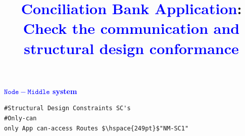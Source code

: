 \documentclass[12pt]{article}
\title{\textcolor{blue}{Conciliation Bank Application}:\\{\large \textcolor{blue}{Check the communication and structural design conformance}}}
\newcommand*{\mcode}[1]{%
$\mathtt{#1}$%
}
\begin{document}
 
\sloppy
\maketitle

\vspace{-0.3cm}
\label{sec:Estruturaltodos}



\noindent\textbf{\textcolor{blue}{\mcode{{Node}{-}{Middle}} system}}
\label{sec:ApendiceAudit}

\label{apend:especArquiteturalNodeMiddle}

\begin{lstlisting}[style=colorido, caption={Especificação do Projeto Arquitetural do orquestrador Node-Middle.},label={list:especArquiteturalNodeMiddle}
]
#Structural Design Constraints SC's
#Only-can
only App can-access Routes $\hspace{249pt}$"NM-SC1"


\end{lstlisting}
\end{document}
